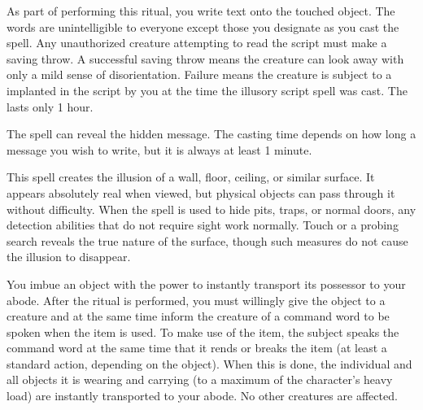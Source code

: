 \begin{spelleffect}
As part of performing this ritual, you write text onto the touched object. The words are unintelligible to everyone except those you designate as you cast the spell. Any unauthorized creature attempting to read the script must make a saving throw. A successful saving throw means the creature can look away with only a mild sense of disorientation. Failure means the creature is subject to a  implanted in the script by you at the time the illusory script spell was cast. The  lasts only 1 hour.
\end{spelleffect}
\begin{spellnotes}
The  spell can reveal the hidden message. The casting time depends on how long a message you wish to write, but it is always at least 1 minute.
\end{spellnotes}

\spellrng{\rngclose}
\begin{spelleffect}
This spell creates the illusion of a wall, floor, ceiling, or similar surface. It appears absolutely real when viewed, but physical objects can pass through it without difficulty. When the spell is used to hide pits, traps, or normal doors, any detection abilities that do not require sight work normally. Touch or a probing search reveals the true nature of the surface, though such measures do not cause the illusion to disappear.
\end{spelleffect}

\spellschool{Conjuration/Transmutation (Imbuement, Translocation) [Teleportation}
\begin{spelleffect}
You imbue an object with the power to instantly transport its possessor to your abode. After the ritual is performed, you must willingly give the object to a creature and at the same time inform the creature of a command word to be spoken when the item is used. To make use of the item, the subject speaks the command word at the same time that it rends or breaks the item (at least a standard action, depending on the object). When this is done, the individual and all objects it is wearing and carrying (to a maximum of the character's heavy load) are instantly transported to your abode. No other creatures are affected.
\end{spelleffect}

